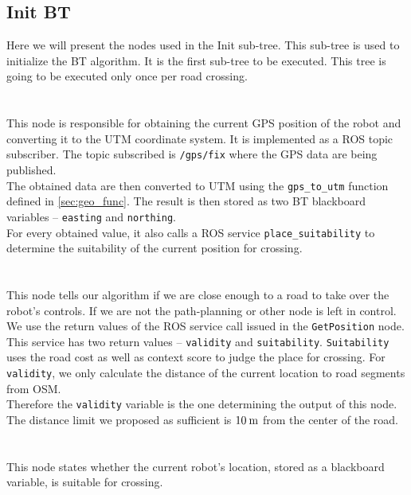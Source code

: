 \subsection{Init BT}
\label{sec:Init-BT-impl}
    Here we will present the nodes used in the Init sub-tree. This sub-tree is used to initialize the BT algorithm. It is the first sub-tree to be executed. This tree is going to be executed only once per road crossing.\\\\
    \\
        This node is responsible for obtaining the current GPS position of the robot and converting it to the UTM coordinate system. It is implemented as a ROS topic subscriber. The topic subscribed is \texttt{/gps/fix} where the GPS data are being published.\\
        The obtained data are then converted to UTM using the \texttt{gps\_to\_utm} function defined in \ref{sec:geo_func}. The result is then stored as two BT blackboard variables -- \texttt{easting} and \texttt{northing}.\\
        For every obtained value, it also calls a ROS service \texttt{place\_suitability} to determine the suitability of the current position for crossing.\\\\
    \\
        This node tells our algorithm if we are close enough to a road to take over the robot's controls. If we are not the path-planning or other node is left in control.\\
        We use the return values of the ROS service call issued in the \texttt{GetPosition} node. This service has two return values -- \texttt{validity} and \texttt{suitability}. \texttt{Suitability} uses the road cost as well as context score to judge the place for crossing. For \texttt{validity}, we only calculate the distance of the current location to road segments from OSM.\\
        Therefore the \texttt{validity} variable is the one determining the output of this node. The distance limit we proposed as sufficient is $10\:\rm{m}$ from the center of the road.\\\\
    \\
        This node states whether the current robot's location, stored as a blackboard variable, is suitable for crossing.\\
